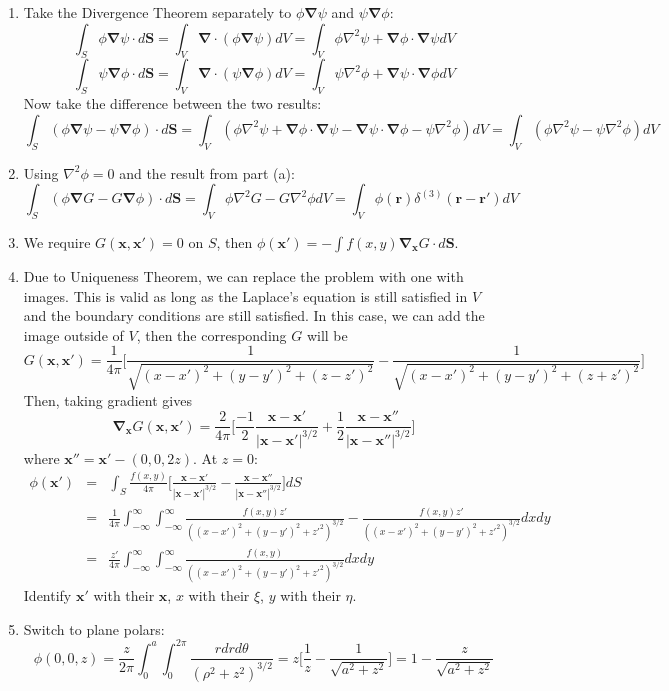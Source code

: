 \documentclass[a4paper]{article}
\begin{document}
\begin{ans}\leavevmode
\begin{enumerate}[label=(\alph*)]
\item Take the Divergence Theorem separately to $\phi\boldsymbol{\nabla}\psi$ and $\psi\boldsymbol{\nabla}\phi$:
$$\int_S\phi\boldsymbol{\nabla}\psi\cdot d\mathbf{S}=\int_V\boldsymbol{\nabla}\cdot(\phi\boldsymbol{\nabla}\psi)dV=\int_V\phi\nabla^2\psi+\boldsymbol{\nabla}\phi\cdot\boldsymbol{\nabla}\psi dV$$
$$\int_S\psi\boldsymbol{\nabla}\phi\cdot d\mathbf{S}=\int_V\boldsymbol{\nabla}\cdot(\psi\boldsymbol{\nabla}\phi)dV=\int_V\psi\nabla^2\phi+\boldsymbol{\nabla}\psi\cdot\boldsymbol{\nabla}\phi dV$$
Now take the difference between the two results:
$$\int_S(\phi\boldsymbol{\nabla}\psi-\psi\boldsymbol{\nabla}\phi)\cdot d\mathbf{S}=\int_V(\phi\nabla^2\psi+\boldsymbol{\nabla}\phi\cdot \boldsymbol{\nabla}\psi-\boldsymbol{\nabla}\psi\cdot\boldsymbol{\nabla}\phi-\psi\nabla^2\phi)dV=\int_V(\phi\nabla^2\psi-\psi\nabla^2\phi)dV$$
\item Using $\nabla^2\phi=0$ and the result from part (a):
$$\int_S(\phi\boldsymbol{\nabla} G-G\boldsymbol{\nabla}\phi)\cdot d\mathbf{S}=\int_V\phi\nabla^2G-G\nabla^2\phi dV=\int_V\phi(\mathbf{r})\delta^{(3)}(\mathbf{r}-\mathbf{r'})dV$$
\item We require $G(\mathbf{x},\mathbf{x'})=0$ on $S$, then $\phi(\mathbf{x'})=-\int f(x,y)\boldsymbol{\nabla_x}G\cdot d\mathbf{S}$.
\item Due to Uniqueness Theorem, we can replace the problem with one with images. This is valid as long as the Laplace's equation is still satisfied in $V$ and the boundary conditions are still satisfied. In this case, we can add the image outside of $V$, then the corresponding $G$ will be
$$G(\mathbf{x},\mathbf{x'})=\frac{1}{4\pi}\bigg[\frac{1}{\sqrt{(x-x')^2+(y-y')^2+(z-z')^2}}-\frac{1}{\sqrt{(x-x')^2+(y-y')^2+(z+z')^2}}\bigg]$$
Then, taking gradient gives
$$\boldsymbol{\nabla_x}G(\mathbf{x},\mathbf{x'})=\frac{2}{4\pi}\bigg[\frac{-1}{2}\frac{\mathbf{x}-\mathbf{x'}}{|\mathbf{x}-\mathbf{x'}|^{3/2}}+\frac{1}{2}\frac{\mathbf{x}-\mathbf{x''}}{|\mathbf{x}-\mathbf{x''}|^{3/2}}\bigg]$$
where $\mathbf{x''}=\mathbf{x'}-(0,0,2z)$. At $z=0$:
\begin{eqnarray}
\phi(\mathbf{x'})&=&\int_S\frac{f(x,y)}{4\pi}\bigg[\frac{\mathbf{x}-\mathbf{x'}}{|\mathbf{x}-\mathbf{x'}|^{3/2}}-\frac{\mathbf{x}-\mathbf{x''}}{|\mathbf{x}-\mathbf{x''}|^{3/2}}\bigg]dS\nonumber\\&=&\frac{1}{4\pi}\int_{-\infty}^\infty\int_{-\infty}^\infty\frac{f(x,y)z'}{((x-x')^2+(y-y')^2+z'^2)^{3/2}}-\frac{f(x,y)z'}{((x-x')^2+(y-y')^2+z'^2)^{3/2}}dxdy\nonumber\\&=&\frac{z'}{4\pi}\int_{-\infty}^\infty\int_{-\infty}^\infty\frac{f(x,y)}{((x-x')^2+(y-y')^2+z'^2)^{3/2}}dxdy\nonumber
\end{eqnarray}
Identify $\mathbf{x'}$ with their $\mathbf{x}$, $x$ with their $\xi$, $y$ with their $\eta$.
\item Switch to plane polars:
$$\phi(0,0,z)=\frac{z}{2\pi}\int_0^a\int_0^{2\pi}\frac{rdrd\theta}{(\rho^2+z^2)^{3/2}}=z\bigg[\frac{1}{z}-\frac{1}{\sqrt{a^2+z^2}}\bigg]=1-\frac{z}{\sqrt{a^2+z^2}}$$
\end{enumerate}
\end{ans}
\end{document}
